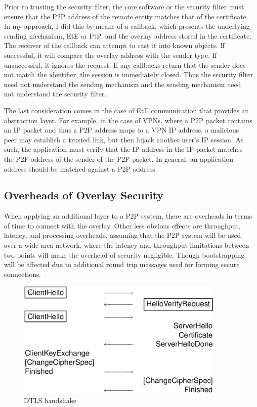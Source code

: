Prior to trusting the security filter, the core software or the security filter
must ensure that the P2P address of the remote entity matches that of the
certificate.  In my approach, I did this by means of a callback, which presents
the underlying sending mechanism, EtE or PtP, and the overlay address stored in
the certificate.  The receiver of the callback can attempt to cast it into
known objects. If successful, it will compare the overlay address with the
sender type.  If unsuccessful, it ignores the request.  If any callbacks return
that the sender does not match the identifier, the session is immediately
closed.  Thus the security filter need not understand the sending mechanism and
the sending mechanism need not understand the security filter.

The last consideration comes in the case of EtE communication that provides an
abstraction layer.  For example, in the case of VPNs, where a P2P packet
contains an IP packet and thus a P2P address maps to a VPN IP address, a
malicious peer may establish a trusted link, but then hijack another user's IP
session.  As such, the application must verify that the IP address in the IP
packet matches the P2P address of the sender of the P2P packet.  In general, an
application address should be matched against a P2P address.

\subsection{Overheads of Overlay Security}

When applying an additional layer to a P2P system, there are overheads in terms
of time to connect with the overlay.  Other less obvious effects are
throughput, latency, and processing overheads, assuming that the P2P system
will be used over a wide area network, where the latency and throughput
limitations between two points will make the overhead of security negligible.
Though bootstrapping will be affected due to additional round trip messages
used for forming secure connections.

\begin{figure}[ht]
\centering
\includegraphics[width=4in]{figs/dtls.eps}
\caption[DTLS handshake]{DTLS handshake}
\label{fig:dtls}
\end{figure}

